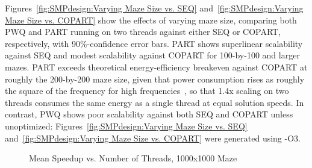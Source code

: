 Figures~\ref{fig:SMPdesign:Varying Maze Size vs. SEQ}
and~\ref{fig:SMPdesign:Varying Maze Size vs. COPART}
show the effects of varying maze size, comparing both PWQ and PART
running on two threads
against either SEQ or COPART, respectively, with 90\%-confidence
error bars.
PART shows superlinear scalability against SEQ and modest scalability
against COPART for 100-by-100 and larger mazes.
PART exceeds theoretical energy-efficiency breakeven against COPART at roughly
the 200-by-200 maze size, given that power consumption rises as roughly
the square of the frequency for high frequencies~\cite{TrevorMudge2000Power},
so that 1.4x scaling on two threads consumes the same energy
as a single thread at equal solution speeds.
In contrast, PWQ shows poor scalability against both SEQ and COPART
unless unoptimized: Figures~\ref{fig:SMPdesign:Varying Maze Size vs. SEQ} 
and~\ref{fig:SMPdesign:Varying Maze Size vs. COPART}
were generated using -O3.
\fi

\begin{figure}[tb]
\begin{center}
\end{center}
\caption{Mean Speedup vs. Number of Threads, 1000x1000 Maze}
\label{fig:SMPdesign:Mean Speedup vs. Number of Threads, 1000x1000 Maze}
\end{figure}

